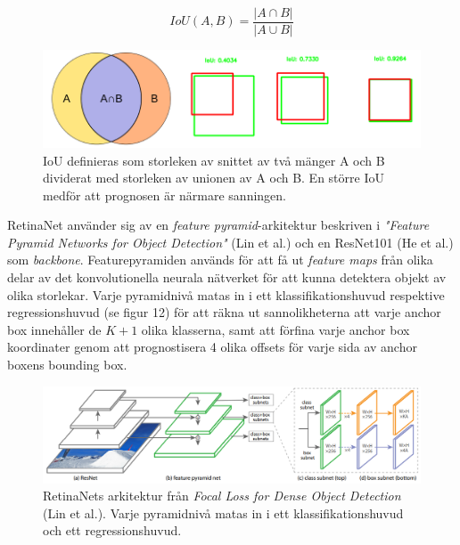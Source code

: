 \documentclass[a4paper,11pt,twoside]{article}
\begin{document}
\begin{equation}
IoU(A, B)=\frac{|A \cap B|}{|A \cup B|}
\end{equation}

\begin{figure}[h]\label{figiou}
	\centering
  		\includegraphics[scale=0.5]{iou.png}
  	\caption{IoU definieras som storleken av snittet av två mänger A och B dividerat med storleken av unionen av A och B. En större IoU medför att prognosen är närmare sanningen. \cite{iou}}
\end{figure}

RetinaNet använder sig av en \textit{feature pyramid}-arkitektur beskriven i \textit{"Feature Pyramid Networks for Object Detection"} (Lin et al.) och en ResNet101 (He et al.) som \textit{backbone}. Featurepyramiden används för att få ut \textit{feature maps} från olika delar av det konvolutionella neurala nätverket för att kunna detektera objekt av olika storlekar. Varje pyramidnivå matas in i ett klassifikationshuvud respektive regressionshuvud (se figur 12) för att räkna ut sannolikheterna att varje anchor box innehåller de $K+1$ olika klasserna, samt att förfina varje anchor box koordinater genom att prognostisera 4 olika offsets för varje sida av anchor boxens bounding box. \cite{resnet} \cite{retinanet} \cite{fpn} 

\begin{figure}[h]\label{figiou}
	\centering
  		\includegraphics[scale=0.38]{retinanet.png}
  	\caption{RetinaNets arkitektur från \textit{Focal Loss for Dense Object Detection} (Lin et al.). Varje pyramidnivå matas in i ett klassifikationshuvud och ett regressionshuvud. \cite{retinanet}}
\end{figure}
\end{document}
